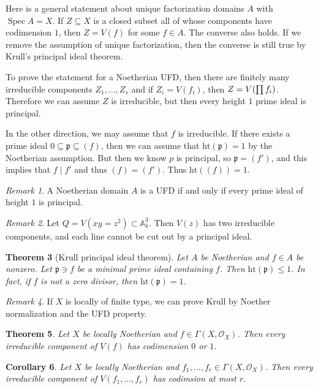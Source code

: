 \documentclass[leqno, openany]{memoir}
\newtheorem{thm}{Theorem}[section]
\newtheorem{cor}[thm]{Corollary}
\theoremstyle{definition}
\theoremstyle{remark}
\newtheorem{rmk}[thm]{Remark}
\theoremstyle{plain}
\theoremstyle{definition}
\theoremstyle{remark}
\newcommand{\A}{\mathbb{A}}
\newcommand{\mf}[1]{\mathfrak{#1}}
\newcommand{\mr}[1]{\mathrm{#1}}
\newcommand{\msc}[1]{\mathscr{#1}}
\DeclareMathOperator{\Spec}{Spec}
\begin{document}
Here is a general statement about unique factorization domains $A$ with $\Spec A = X$. If $Z \subseteq X$ is a closed subset all of whose components have codimension $1$, then $Z = V(f)$ for some $f \in A$. The converse also holds. If we remove the assumption of unique factorization, then the converse is still true by Krull's principal ideal theorem. 

To prove the statement for a Noetherian UFD, then there are finitely many irreducible components $Z_1, \ldots, Z_s$ and if $Z_i = V(f_i)$, then $Z = V\qty(\prod f_i)$. Therefore we can assume $Z$ is irreducible, but then every height $1$ prime ideal is principal.

In the other direction, we may assume that $f$ is irreducible. If there exists a prime ideal $0 \subseteq \mf{p} \subseteq (f)$, then we can assume that $\mr{ht}(\mf{p}) = 1$ by the Noetherian assumption. But then we know $p$ is principal, so $\mf{p} = (f')$, and this implies that $f \mid f'$ and thus $(f) = (f')$. Thus $\mr{ht}((f)) = 1$.

\begin{rmk}
    A Noetherian domain $A$ is a UFD if and only if every prime ideal of height $1$ is principal.
\end{rmk}

\begin{rmk}
    Let $Q = V(xy = z^2) \subset \A^3_k$. Then $V(z)$ has two irreducible components, and each line cannot be cut out by a principal ideal.
\end{rmk}

\begin{thm}[Krull principal ideal theorem]
    Let $A$ be Noetherian and $f \in A$ be nonzero. Let $\mf{p} \ni f$ be a minimal prime ideal containing $f$. Then $\mr{ht}(\mf{p}) \leq 1$. In fact, if $f$ is not a zero divisor, then $\mr{ht}(\mf{p}) = 1$.
\end{thm}

\begin{rmk}
    If $X$ is locally of finite type, we can prove Krull by Noether normalization and the UFD property.
\end{rmk}

\begin{thm}
    Let $X$ be locally Noetherian and $f \in \Gamma(X, \msc{O}_X)$. Then every irreducible component of $V(f)$ has codimension $0$ or $1$.
\end{thm}

\begin{cor}
    Let $X$ be locally Noetherian and $f_1, \ldots, f_r \in \Gamma(X, \msc{O}_X)$. Then every irreducible component of $V(f_1, \ldots, f_r)$ has codimsion at most $r$.
\end{cor}
\end{document}
